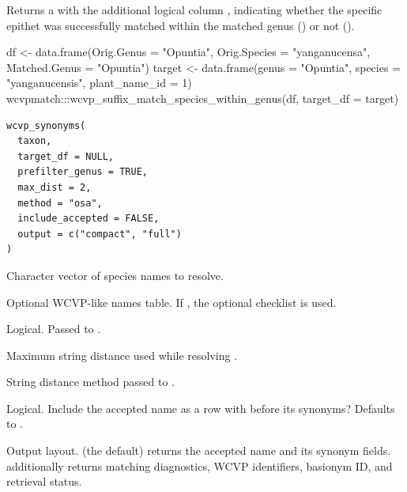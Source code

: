 \documentclass[a4paper]{book}
\begin{document}
%
\begin{Value}
Returns a  with the additional logical column , indicating whether the specific epithet was successfully matched within the matched genus () or not ().
\end{Value}
%
\begin{Examples}
\begin{ExampleCode}

df <- data.frame(Orig.Genus = "Opuntia", Orig.Species = "yanganucensa", Matched.Genus = "Opuntia")
target <- data.frame(genus = "Opuntia", species = "yanganucensis", plant_name_id = 1)
wcvpmatch:::wcvp_suffix_match_species_within_genus(df, target_df = target)

\end{ExampleCode}
\end{Examples}
%
\begin{Description}
\strong{[Stable]}
\end{Description}
%
\begin{Usage}
\begin{verbatim}
wcvp_synonyms(
  taxon,
  target_df = NULL,
  prefilter_genus = TRUE,
  max_dist = 2,
  method = "osa",
  include_accepted = FALSE,
  output = c("compact", "full")
)
\end{verbatim}
\end{Usage}
%
\begin{Arguments}
\begin{ldescription}
\item[\code{taxon}] Character vector of species names to resolve.

\item[\code{target\_df}] Optional WCVP-like names table. If , the optional
 checklist is used.

\item[\code{prefilter\_genus}] Logical. Passed to .

\item[\code{max\_dist}] Maximum string distance used while resolving .

\item[\code{method}] String distance method passed to .

\item[\code{include\_accepted}] Logical. Include the accepted name as a row with
 before its synonyms? Defaults to .

\item[\code{output}] Output layout.  (the default) returns the accepted
name and its synonym fields.  additionally returns matching
diagnostics, WCVP identifiers, basionym ID, and retrieval status.
\end{ldescription}
\end{Arguments}
\end{document}
